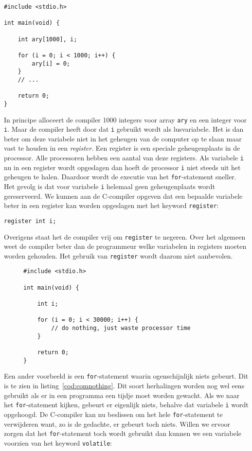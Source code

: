 \begin{lstlisting}[caption=Een C-programma.,label=cod:comclearary]
#include <stdio.h>

int main(void) {

    int ary[1000], i;
    
    for (i = 0; i < 1000; i++) {
        ary[i] = 0;
    }
    // ...
    
    return 0;
}
\end{lstlisting}

In principe alloceert de compiler 1000 integers voor array \texttt{ary} en een integer voor \texttt{i}. Maar de compiler heeft door dat \texttt{i} gebruikt wordt als lusvariabele. Het is dan beter om deze variabele niet in het geheugen van de computer op te slaan maar vast te houden in een \textsl{register}. Een register is een speciale geheugenplaats in de processor. Alle processoren hebben een aantal van deze registers. Als variabele \texttt{i} nu in een register wordt opgeslagen dan hoeft de processor \texttt{i} niet steeds uit het geheugen te halen. Daardoor wordt de executie van het \texttt{for}-statement sneller. Het gevolg is dat voor variabele \texttt{i} helemaal geen geheugenplaats wordt gereserveerd. We kunnen aan de C-compiler opgeven dat een bepaalde variabele beter in een register kan worden opgeslagen met het keyword \texttt{register}:

\hspace*{1em}\texttt{register int i;}

Overigens staat het de compiler vrij om \texttt{register} te negeren. Over het algemeen weet de compiler beter dan de programmeur welke variabelen in registers moeten worden gehouden. Het gebruik van \texttt{register} wordt daarom niet aanbevolen.

\begin{figure}[!ht]
\begin{lstlisting}[caption=Een C-programma.,label=cod:comnothing]
#include <stdio.h>

int main(void) {

    int i;
    
    for (i = 0; i < 30000; i++) {
        // do nothing, just waste processor time
    }
    
    return 0;
}
\end{lstlisting}
\end{figure}

Een ander voorbeeld is een \texttt{for}-statement waarin ogenschijnlijk niets gebeurt. Dit is te zien in listing~\ref{cod:comnothing}.
Dit soort herhalingen worden nog wel eens gebruikt als er in een programma een tijdje moet worden gewacht. Als we naar het \texttt{for}-statement kijken, gebeurt er eigenlijk niets, behalve dat variabele \texttt{i} wordt opgehoogd. De C-compiler kan nu beslissen om het hele \texttt{for}-statement te verwijderen want, zo is de gedachte, er gebeurt toch niets. Willen we ervoor zorgen dat het \texttt{for}-statement toch wordt gebruikt dan kunnen we een variabele voorzien van het keyword \texttt{volatile}:

